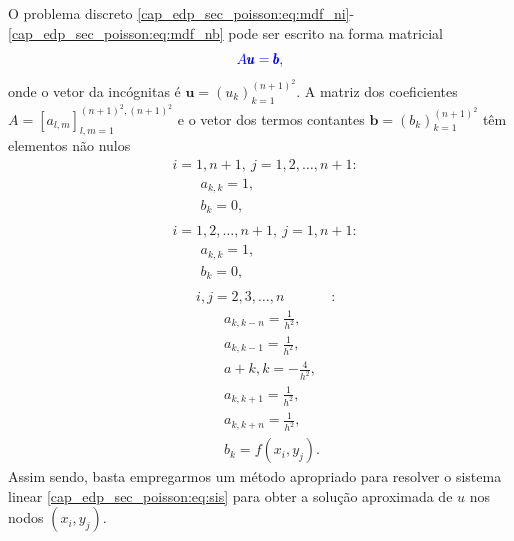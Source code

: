 O problema discreto \eqref{cap_edp_sec_poisson:eq:mdf_ni}-\eqref{cap_edp_sec_poisson:eq:mdf_nb} pode ser escrito na forma matricial
\begin{equation}\label{cap_edp_sec_poisson:eq:sis}\color{blue}A\pmb{u} = \pmb{b},
\end{equation}
onde o vetor da incógnitas é $\pmb{u}=(u_k)_{k=1}^{(n+1)^2}$. A matriz dos coeficientes $A = [a_{l,m}]_{l,m=1}^{(n+1)^2,(n+1)^2}$ e o vetor dos termos contantes $\pmb{b} = (b_{k})_{k=1}^{(n+1)^2}$ têm elementos não nulos
\begin{equation}
  \begin{aligned}
    &i=1, n+1, ~j=1, 2, \dotsc, n+1:\\
    &\qquad a_{k,k} = 1,\\
    &\qquad b_k = 0,\\
  \end{aligned}
\end{equation}
\begin{equation}
  \begin{aligned}
    &i=1, 2, \dotsc, n+1, ~j=1, n+1:\\
    &\qquad a_{k,k} = 1,\\
    &\qquad b_k = 0,\\
  \end{aligned}
\end{equation}
\begin{equation}
  \begin{aligned}
    &i,j=2, 3, \dotsc, n &:\\
    &\qquad a_{k,k-n} = \frac{1}{h^2},\\
    &\qquad a_{k,k-1} = \frac{1}{h^2},\\
    &\qquad a+{k,k} = -\frac{4}{h^2},\\
    &\qquad a_{k,k+1} = \frac{1}{h^2},\\
    &\qquad a_{k,k+n} = \frac{1}{h^2},\\
    &\qquad b_{k} = f(x_i, y_j).
  \end{aligned}
\end{equation}
Assim sendo, basta empregarmos um método apropriado para resolver o sistema linear \eqref{cap_edp_sec_poisson:eq:sis} para obter a solução aproximada de $u$ nos nodos $(x_i, y_j)$.

